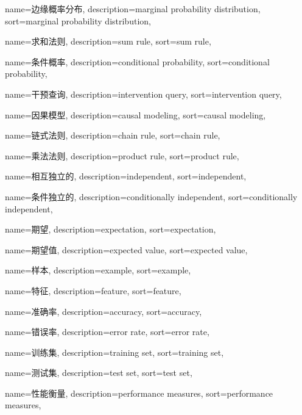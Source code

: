 {
  name=边缘概率分布,
  description={marginal probability distribution},
  sort={marginal probability distribution},
}

{
  name=求和法则,
  description={sum rule},
  sort={sum rule},
}

{
  name=条件概率,
  description={conditional probability},
  sort={conditional probability},
}

{
  name=干预查询,
  description={intervention query},
  sort={intervention query},
}

{
  name=因果模型,
  description={causal modeling},
  sort={causal modeling},
}

{
  name=链式法则,
  description={chain rule},
  sort={chain rule},
}

{
  name=乘法法则,
  description={product rule},
  sort={product rule},
}

{
  name=相互独立的,
  description={independent},
  sort={independent},
}

{
  name=条件独立的,
  description={conditionally independent},
  sort={conditionally independent},
}

{
  name=期望,
  description={expectation},
  sort={expectation},
}

{
  name=期望值,
  description={expected value},
  sort={expected value},
}

{
  name=样本,
  description={example},
  sort={example},
}

{
  name=特征,
  description={feature},
  sort={feature},
}

{
  name=准确率,
  description={accuracy},
  sort={accuracy},
}

{
  name=错误率,
  description={error rate},
  sort={error rate},
}

{
  name=训练集,
  description={training set},
  sort={training set},
}

{
  name=测试集,
  description={test set},
  sort={test set},
}

{
  name=性能衡量,
  description={performance measures},
  sort={performance measures},
}

